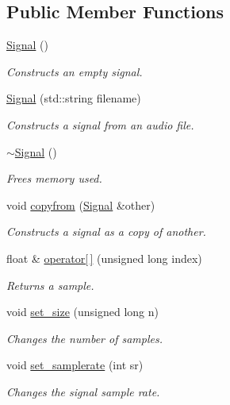 \subsection*{\-Public \-Member \-Functions}
\begin{DoxyCompactItemize}
\item 
\hyperlink{classSignal_a7e69e538253d90c3f551f4701a1f94a5}{\-Signal} ()
\begin{DoxyCompactList}\small\item\em \-Constructs an empty signal. \end{DoxyCompactList}\item 
\hyperlink{classSignal_a790a11398e80a3dc45150929d125c106}{\-Signal} (std\-::string filename)
\begin{DoxyCompactList}\small\item\em \-Constructs a signal from an audio file. \end{DoxyCompactList}\item 
\hyperlink{classSignal_ae7a1d116cda63e790bf9aab549d57d3a}{$\sim$\-Signal} ()
\begin{DoxyCompactList}\small\item\em \-Frees memory used. \end{DoxyCompactList}\item 
void \hyperlink{classSignal_aeb64be9cdd11502baf340a9afe90ec51}{copyfrom} (\hyperlink{classSignal}{\-Signal} \&other)
\begin{DoxyCompactList}\small\item\em \-Constructs a signal as a copy of another. \end{DoxyCompactList}\item 
float \& \hyperlink{classSignal_a266bed8696158c9942ee52d05042ddef}{operator\mbox{[}$\,$\mbox{]}} (unsigned long index)
\begin{DoxyCompactList}\small\item\em \-Returns a sample. \end{DoxyCompactList}\item 
void \hyperlink{classSignal_a3f498716b36a015db3cb536879b908b4}{set\-\_\-size} (unsigned long n)
\begin{DoxyCompactList}\small\item\em \-Changes the number of samples. \end{DoxyCompactList}\item 
void \hyperlink{classSignal_a62a8aa2204f3fd0b657b0985bca45f76}{set\-\_\-samplerate} (int sr)
\begin{DoxyCompactList}\small\item\em \-Changes the signal sample rate. \end{DoxyCompactList}\item 

\end{DoxyCompactItemize}
